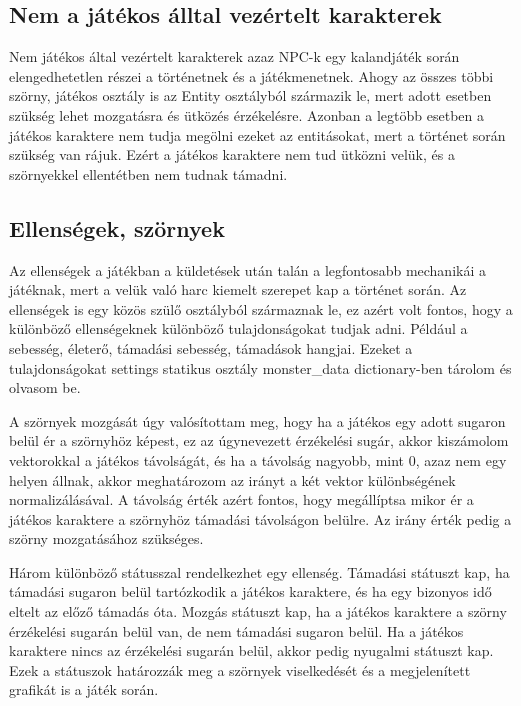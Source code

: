 \subsection{Nem a játékos álltal vezértelt karakterek}
\indent \indent Nem játékos által vezértelt karakterek azaz NPC-k egy kalandjáték során elengedhetetlen részei a történetnek és a játékmenetnek. Ahogy az összes többi szörny, játékos osztály is az Entity osztályból származik le, mert adott esetben szükség lehet mozgatásra és ütközés érzékelésre. Azonban a legtöbb esetben a játékos karaktere nem tudja megölni ezeket az entitásokat, mert a történet során szükség van rájuk. Ezért a játékos karaktere nem tud ütközni velük, és a szörnyekkel ellentétben nem tudnak támadni.

\subsection{Ellenségek, szörnyek}

\indent \indent Az ellenségek a játékban a küldetések után talán a legfontosabb mechanikái a játéknak, mert a velük való harc kiemelt szerepet kap a történet során.
Az ellenségek is egy közös szülő osztályból származnak le, ez azért volt fontos, hogy a különböző ellenségeknek különböző tulajdonságokat tudjak adni. Például a sebesség, életerő, támadási sebesség, támadások hangjai. Ezeket a tulajdonságokat settings statikus osztály monster\_data dictionary-ben tárolom és olvasom be.

A szörnyek mozgását úgy valósítottam meg, hogy ha a játékos egy adott sugaron belül ér a szörnyhöz képest, ez az úgynevezett érzékelési sugár, akkor kiszámolom vektorokkal a játékos távolságát, és ha a távolság nagyobb, mint 0, azaz nem egy helyen állnak, akkor meghatározom az irányt a két vektor különbségének normalizálásával. A távolság érték azért fontos, hogy megállíptsa mikor ér a játékos karaktere a szörnyhöz támadási távolságon belülre. Az irány érték pedig a szörny mozgatásához szükséges.

Három különböző státusszal rendelkezhet egy ellenség. Támadási státuszt kap, ha támadási sugaron belül tartózkodik a játékos karaktere, és ha egy bizonyos idő eltelt az előző támadás óta. Mozgás státuszt kap, ha a játékos karaktere a szörny érzékelési sugarán belül van, de nem támadási sugaron belül. Ha a játékos karaktere nincs az érzékelési sugarán belül, akkor pedig nyugalmi státuszt kap. Ezek a státuszok határozzák meg a szörnyek viselkedését és a megjelenített grafikát is a játék során.

